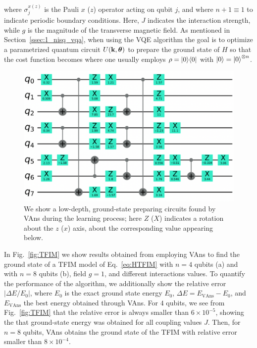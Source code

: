 where $\sigma_j^{x(z)}$ is the Pauli $x$ ($z$) operator acting on qubit $j$, and where $n+1\equiv 1$ to indicate periodic boundary conditions. Here, $J$ indicates the interaction strength, while $g$ is the magnitude of the transverse magnetic field. As mentioned in Section~\ref{ssec:1_nisq_vqa}, when using the VQE algorithm the goal is to optimize a parametrized quantum circuit $U(\mathbf{k},\bm{\theta})$ to prepare the ground state of $H$ so that the cost function becomes 
where one usually employs $\rho=\proj{0}$ with $\ket{0}=\ket{0}^{\otimes n}$.%

\begin{figure}[h]
\centering
\includegraphics[width=.9\textwidth]{Figures/VANS/circTFIM.pdf}
\caption{We show a low-depth, ground-state preparing circuits found by VAns during the learning process; here $Z$ ($X$) indicates a rotation about the $z$ ($x$) axis, about the corresponding value appearing below.}
\label{fig:circui}
\end{figure}

In Fig.~\ref{fig:TFIM} we show results obtained from employing VAns to find the ground state of a TFIM model of Eq.~\eqref{eq:HTFIM} with $n=4$ qubits (a) and with $n=8$ qubits (b), field $g=1$, and different interactions values. To quantify the performance of the algorithm, we  additionally show the relative error $\left|\Delta E/E_0\right|$, where $E_0$ is the exact ground state energy $E_0$, $\Delta E=E_{\text{VAns}}-E_0$, and $E_{\text{VAns}}$ the best energy obtained through VAns. For $4$ qubits, we see from Fig.~\ref{fig:TFIM} that the relative error is always smaller than $6\times 10^{-5}$, showing the that ground-state energy was obtained for all coupling values $J$. Then, for $n=8$ qubits, VAns obtains the ground state of the TFIM with relative error smaller than $8\times 10^{-4}$.

